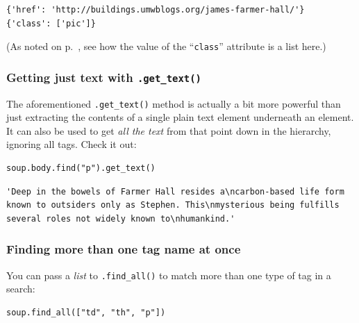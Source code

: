 \begin{Verbatim}[fontsize=\small,samepage=true,frame=leftline,framesep=5mm,framerule=1mm]
{'href': 'http://buildings.umwblogs.org/james-farmer-hall/'}
{'class': ['pic']}
\end{Verbatim}

(As noted on p.~\pageref{classIsAttribute}, see how the value of the
``\texttt{class}'' attribute is a list here.)

\subsubsection{Getting just text with \texttt{.get\_text()}}


The aforementioned \texttt{.get\_text()} method is actually a bit more
powerful than just extracting the contents of a single plain text element
underneath an element. It can also be used to get \textit{all the text} from
that point down in the hierarchy, ignoring all tags. Check it out:

\begin{Verbatim}[fontsize=\small,samepage=true,frame=single,framesep=3mm]
soup.body.find("p").get_text()
\end{Verbatim}
\vspace{-.3in}

\begin{Verbatim}[fontsize=\scriptsize,samepage=true,frame=leftline,framesep=5mm,framerule=1mm]
'Deep in the bowels of Farmer Hall resides a\ncarbon-based life form
known to outsiders only as Stephen. This\nmysterious being fulfills
several roles not widely known to\nhumankind.'
\end{Verbatim}

\subsubsection{Finding more than one tag name at once}


You can pass a \textit{list} to \texttt{.find\_all()} to match more than one
type of tag in a search:

\begin{Verbatim}[fontsize=\small,samepage=true,frame=single,framesep=3mm]
soup.find_all(["td", "th", "p"])
\end{Verbatim}

